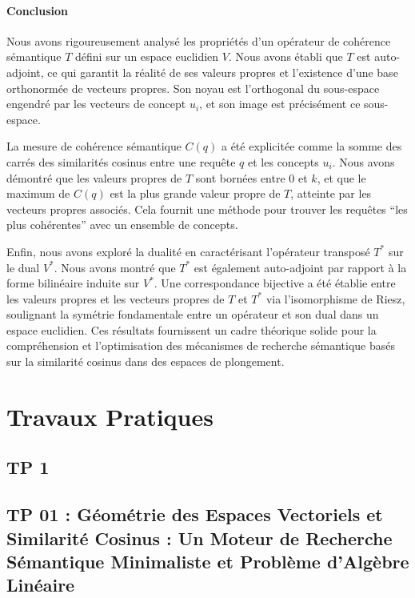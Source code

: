 \documentclass[11pt,a4paper]{report}
\begin{document}
\hypertarget{conclusion}{%
\subsubsection{Conclusion}\label{conclusion}}

Nous avons rigoureusement analysé les propriétés d'un opérateur de
cohérence sémantique \(T\) défini sur un espace euclidien \(V\). Nous
avons établi que \(T\) est auto-adjoint, ce qui garantit la réalité de
ses valeurs propres et l'existence d'une base orthonormée de vecteurs
propres. Son noyau est l'orthogonal du sous-espace engendré par les
vecteurs de concept \(u_i\), et son image est précisément ce
sous-espace.

La mesure de cohérence sémantique \(C(q)\) a été explicitée comme la
somme des carrés des similarités cosinus entre une requête \(q\) et les
concepts \(u_i\). Nous avons démontré que les valeurs propres de \(T\)
sont bornées entre \(0\) et \(k\), et que le maximum de \(C(q)\) est la
plus grande valeur propre de \(T\), atteinte par les vecteurs propres
associés. Cela fournit une méthode pour trouver les requêtes ``les plus
cohérentes'' avec un ensemble de concepts.

Enfin, nous avons exploré la dualité en caractérisant l'opérateur
transposé \(T^*\) sur le dual \(V^*\). Nous avons montré que \(T^*\) est
également auto-adjoint par rapport à la forme bilinéaire induite sur
\(V^*\). Une correspondance bijective a été établie entre les valeurs
propres et les vecteurs propres de \(T\) et \(T^*\) via l'isomorphisme
de Riesz, soulignant la symétrie fondamentale entre un opérateur et son
dual dans un espace euclidien. Ces résultats fournissent un cadre
théorique solide pour la compréhension et l'optimisation des mécanismes
de recherche sémantique basés sur la similarité cosinus dans des espaces
de plongement.


\chapter{Travaux Pratiques}
\section*{TP 1}
\hypertarget{tp-01-guxe9omuxe9trie-des-espaces-vectoriels-et-similarituxe9-cosinus-un-moteur-de-recherche-suxe9mantique-minimaliste-et-probluxe8me-dalguxe8bre-linuxe9aire}{%
\section{TP 01 : Géométrie des Espaces Vectoriels et Similarité Cosinus
: Un Moteur de Recherche Sémantique Minimaliste et Problème d'Algèbre
Linéaire}\label{tp-01-guxe9omuxe9trie-des-espaces-vectoriels-et-similarituxe9-cosinus-un-moteur-de-recherche-suxe9mantique-minimaliste-et-probluxe8me-dalguxe8bre-linuxe9aire}}
\end{document}
